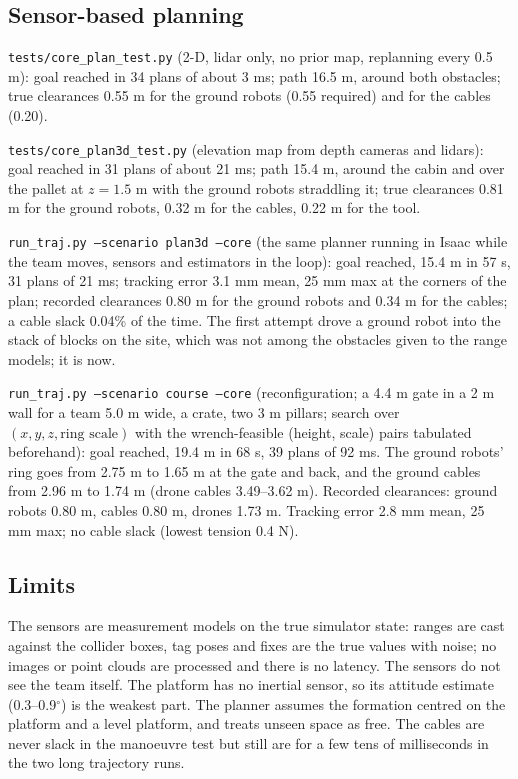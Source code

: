 \subsection{Sensor-based planning}
\texttt{tests/core\_plan\_test.py} (2-D, lidar only, no prior map, replanning every 0.5 m): goal reached in 34
plans of about 3 ms; path 16.5 m, around both obstacles; true clearances 0.55 m for the ground robots (0.55
required) and for the cables (0.20).

\texttt{tests/core\_plan3d\_test.py} (elevation map from depth cameras and lidars): goal reached in 31 plans of
about 21 ms; path 15.4 m, around the cabin and over the pallet at $z=1.5$ m with the ground robots straddling it;
true clearances 0.81 m for the ground robots, 0.32 m for the cables, 0.22 m for the tool.

\texttt{run\_traj.py --scenario plan3d --core} (the same planner running in Isaac while the team moves, sensors
and estimators in the loop): goal reached, 15.4 m in 57 s, 31 plans of 21 ms; tracking error 3.1 mm mean, 25 mm
max at the corners of the plan; recorded clearances 0.80 m for the ground robots and 0.34 m for the cables; a
cable slack 0.04\% of the time. The first attempt drove a ground robot into the stack of blocks on the site,
which was not among the obstacles given to the range models; it is now.

\texttt{run\_traj.py --scenario course --core} (reconfiguration; a 4.4 m gate in a 2 m wall for a team 5.0 m wide,
a crate, two 3 m pillars; search over $(x,y,z,\text{ring scale})$ with the wrench-feasible (height, scale) pairs
tabulated beforehand): goal reached, 19.4 m in 68 s, 39 plans of 92 ms. The ground robots' ring goes from 2.75 m to
1.65 m at the gate and back, and the ground cables from 2.96 m to 1.74 m (drone cables 3.49--3.62 m). Recorded
clearances: ground robots 0.80 m, cables 0.80 m, drones 1.73 m. Tracking error 2.8 mm mean, 25 mm max; no cable
slack (lowest tension 0.4 N).

\subsection{Limits}
The sensors are measurement models on the true simulator state: ranges are cast against the collider boxes, tag
poses and fixes are the true values with noise; no images or point clouds are processed and there is no latency.
The sensors do not see the team itself. The platform has no inertial sensor, so its attitude estimate
(0.3--0.9$^\circ$) is the weakest part. The planner assumes the formation centred on the platform and a level
platform, and treats unseen space as free. The cables are never slack in the manoeuvre test but still are for a
few tens of milliseconds in the two long trajectory runs.

